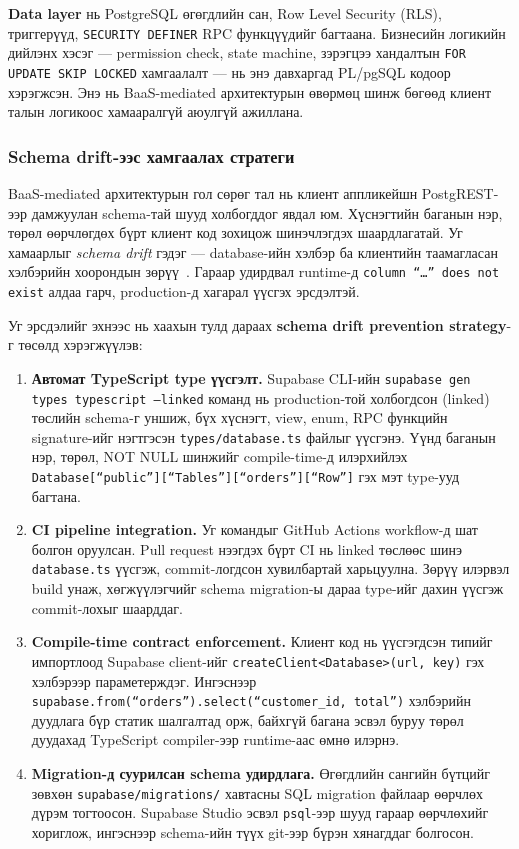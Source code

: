 \textbf{Data layer} нь PostgreSQL өгөгдлийн сан, Row Level Security (RLS), триггерүүд, \texttt{SECURITY DEFINER} RPC функцүүдийг багтаана. Бизнесийн логикийн дийлэнх хэсэг — permission check, state machine, зэрэгцээ хандалтын \texttt{FOR UPDATE SKIP LOCKED} хамгаалалт — нь энэ давхаргад PL/pgSQL кодоор хэрэгжсэн. Энэ нь BaaS-mediated архитектурын өвөрмөц шинж бөгөөд клиент талын логикоос хамааралгүй аюулгүй ажиллана.

\subsubsection{Schema drift-ээс хамгаалах стратеги}
\label{subsubsec:schema_drift}

BaaS-mediated архитектурын гол сөрөг тал нь клиент аппликейшн PostgREST-ээр дамжуулан schema-тай шууд холбогддог явдал юм. Хүснэгтийн баганын нэр, төрөл өөрчлөгдөх бүрт клиент код зохицож шинэчлэгдэх шаардлагатай. Уг хамаарлыг \textit{schema drift} гэдэг — database-ийн хэлбэр ба клиентийн таамагласан хэлбэрийн хоорондын зөрүү~\cite{fowler2003evolutionary}. Гараар удирдвал runtime-д \texttt{column ``\ldots'' does not exist} алдаа гарч, production-д хагарал үүсгэх эрсдэлтэй.

Уг эрсдэлийг эхнээс нь хаахын тулд дараах \textbf{schema drift prevention strategy}-г төсөлд хэрэгжүүлэв:

\begin{enumerate}
  \item \textbf{Автомат TypeScript type үүсгэлт.} Supabase CLI-ийн \texttt{supabase gen types typescript --linked} команд нь production-той холбогдсон (linked) төслийн schema-г уншиж, бүх хүснэгт, view, enum, RPC функцийн signature-ийг нэгтгэсэн \texttt{types/database.ts} файлыг үүсгэнэ. Үүнд баганын нэр, төрөл, NOT NULL шинжийг compile-time-д илэрхийлэх \texttt{Database[``public''][``Tables''][``orders''][``Row'']} гэх мэт type-ууд багтана.

  \item \textbf{CI pipeline integration.} Уг командыг GitHub Actions workflow-д шат болгон оруулсан. Pull request нээгдэх бүрт CI нь linked төслөөс шинэ \texttt{database.ts} үүсгэж, commit-логдсон хувилбартай харьцуулна. Зөрүү илэрвэл build унаж, хөгжүүлэгчийг schema migration-ы дараа type-ийг дахин үүсгэж commit-лохыг шаарддаг.

  \item \textbf{Compile-time contract enforcement.} Клиент код нь үүсгэгдсэн типийг импортлоод Supabase client-ийг \texttt{createClient<Database>(url, key)} гэх хэлбэрээр параметерждэг. Ингэснээр \texttt{supabase.from(``orders'').select(``customer\_id, total'')} хэлбэрийн дуудлага бүр статик шалгалтад орж, байхгүй багана эсвэл буруу төрөл дуудахад TypeScript compiler-ээр runtime-аас өмнө илэрнэ.

  \item \textbf{Migration-д суурилсан schema удирдлага.} Өгөгдлийн сангийн бүтцийг зөвхөн \texttt{supabase/migrations/} хавтасны SQL migration файлаар өөрчлөх дүрэм тогтоосон. Supabase Studio эсвэл \texttt{psql}-ээр шууд гараар өөрчлөхийг хориглож, ингэснээр schema-ийн түүх git-ээр бүрэн хянагддаг болгосон.
\end{enumerate}

